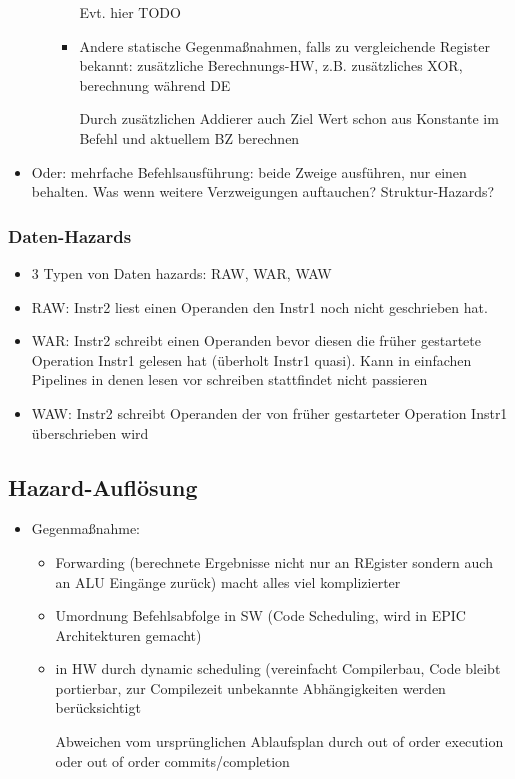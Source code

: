 \begin{itemize}
\begin{itemize}
\begin{itemize}
						Evt. hier TODO
					\item
						Andere statische Gegenmaßnahmen, falls zu vergleichende Register bekannt: zusätzliche Berechnungs-HW, z.B. zusätzliches XOR, berechnung während DE

						Durch zusätzlichen Addierer auch Ziel Wert schon aus Konstante im Befehl und aktuellem BZ berechnen
				\end{itemize}

		\end{itemize}
	\item
		Oder: mehrfache Befehlsausführung: beide Zweige ausführen, nur einen behalten. Was wenn weitere Verzweigungen auftauchen? Struktur-Hazards?
\end{itemize}

\subsubsection{Daten-Hazards}
\begin{itemize}
	\item
		3 Typen von Daten hazards: RAW, WAR, WAW
	\item
		RAW: Instr2 liest einen Operanden den Instr1 noch nicht geschrieben hat.
	\item
		WAR: Instr2 schreibt einen Operanden bevor diesen die früher gestartete Operation Instr1 gelesen hat (überholt Instr1 quasi). Kann in einfachen Pipelines in denen lesen vor schreiben stattfindet nicht passieren
	\item
		WAW: Instr2 schreibt Operanden der von früher gestarteter Operation Instr1 überschrieben wird

\end{itemize}

\subsection{Hazard-Auflösung}
\begin{itemize}
	\item
		Gegenmaßnahme:
		\begin{itemize}
			\item
				Forwarding (berechnete Ergebnisse nicht nur an REgister sondern auch an ALU Eingänge zurück) macht alles viel komplizierter
			\item
				Umordnung Befehlsabfolge in SW (Code Scheduling, wird in EPIC Architekturen gemacht)
			\item
				in HW durch dynamic scheduling (vereinfacht Compilerbau, Code bleibt portierbar, zur Compilezeit unbekannte Abhängigkeiten werden berücksichtigt

				Abweichen vom ursprünglichen Ablaufsplan durch out of order execution oder out of order commits/completion
		\end{itemize}
\end{itemize}
